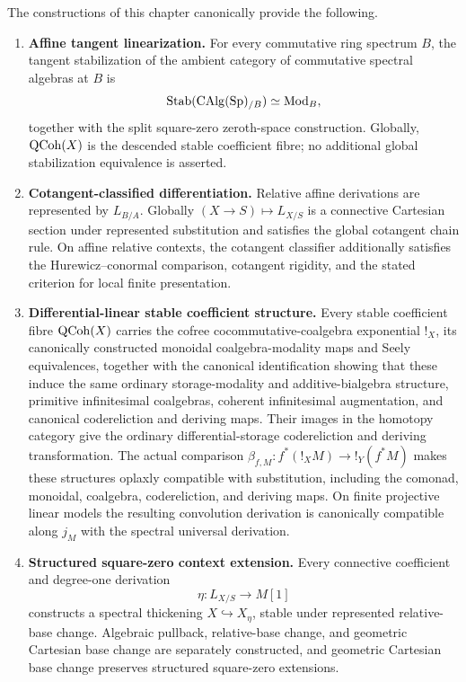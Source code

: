 \begin{theorem}
\label{thm:differentiated-spectral-doctrine-interface}
The constructions of this chapter canonically provide the following.
\begin{enumerate}[label=(\roman*)]
    \item \textbf{Affine tangent linearization.}
    For every commutative ring spectrum \(B\), the tangent stabilization of the
    ambient category of commutative spectral algebras at \(B\) is
    \[
        \operatorname{Stab}(\operatorname{CAlg}(\operatorname{Sp})_{/B})\simeq\operatorname{Mod}_B,
    \]
    together with the split square-zero zeroth-space construction. Globally,
    \(\operatorname{QCoh}(X)\) is the descended stable coefficient fibre; no additional
    global stabilization equivalence is asserted.

    \item \textbf{Cotangent-classified differentiation.}
    Relative affine derivations are represented by \(L_{B/A}\). Globally
    \((X\to S)\mapsto L_{X/S}\) is a connective Cartesian section under
    represented substitution and satisfies the global cotangent chain rule.
    On affine relative contexts, the cotangent classifier additionally
    satisfies the Hurewicz--conormal comparison, cotangent rigidity, and the
    stated criterion for local finite presentation.

    \item \textbf{Differential-linear stable coefficient structure.}
    Every stable coefficient fibre \(\operatorname{QCoh}(X)\) carries the cofree
    cocommutative-coalgebra exponential \(!_X\), its canonically constructed
    monoidal coalgebra-modality maps and Seely equivalences, together with the
    canonical identification showing that these induce the same ordinary
    storage-modality and additive-bialgebra structure, primitive infinitesimal
    coalgebras, coherent infinitesimal augmentation, and canonical
    codereliction and deriving maps. Their images in the homotopy
    category give the ordinary differential-storage codereliction and deriving
    transformation. The actual comparison
    \(\beta_{f,M}:f^*(!_XM)\to !_Y(f^*M)\) makes these structures oplaxly
    compatible with substitution, including the comonad, monoidal, coalgebra,
    codereliction, and deriving maps. On finite projective linear models the
    resulting convolution derivation is canonically compatible along \(j_M\)
    with the spectral universal derivation.

    \item \textbf{Structured square-zero context extension.}
    Every connective coefficient and degree-one derivation
    \[
        \eta:L_{X/S}\longrightarrow M[1]
    \]
    constructs a spectral thickening \(X\hookrightarrow X_\eta\), stable under
    represented relative-base change. Algebraic pullback, relative-base
    change, and geometric Cartesian base change are separately constructed,
    and geometric Cartesian base change preserves structured square-zero
    extensions.


\end{enumerate}
\end{theorem}
